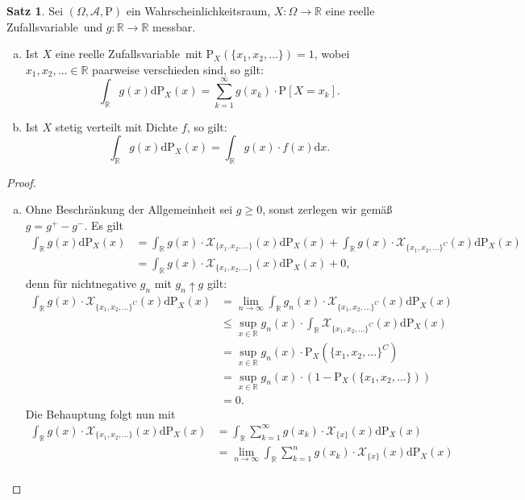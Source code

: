 \documentclass[a4paper,12pt,fleqn]{scrartcl}
\newcommand{\R}{\mathbb{R}}
\newcommand{\m}[1]{\mathcal{ #1 }}
\newcommand{\WR}{Wahrscheinlichkeitsraum}
\newcommand{\ZV}{Zufallsvariable}
\theoremstyle{definition}
\newtheorem{satz}[definition]{Satz}
\theoremstyle{plain}
\theoremstyle{remark}
\begin{document}
\begin{satz}
Sei $(\Omega, \m{A}, \text{P})$ ein \WR, $X: \Omega \rightarrow \R$ eine reelle \ZV \, und $g: \R \rightarrow \R$ messbar.
\begin{enumerate}[a)]
\item Ist $X$ eine reelle \ZV \, mit $\text{P}_X(\{x_1, x_2, \ldots\}) = 1$, wobei $x_1, x_2, \ldots \in \R$ paarweise verschieden sind, so gilt:
\[\int_\R g(x) \mathrm{d}\text{P}_X(x) = \sum_{k=1}^\infty g(x_k) \cdot \text{P}[X = x_k].\]
\item Ist $X$ stetig verteilt mit Dichte $f$, so gilt:
\[\int_\R g(x) \mathrm{d}\text{P}_X(x) = \int_\R g(x) \cdot f(x) \mathrm{d}x.\]
\end{enumerate}
\end{satz}
\begin{proof}
\begin{enumerate}[a)]
\item Ohne Beschränkung der Allgemeinheit sei $g \geq 0$, sonst zerlegen wir gemäß $g = g^+ - g^-$. Es gilt
\begin{align*}
\int_\R g(x) \mathrm{d}\text{P}_X(x) &= \int_\R g(x) \cdot \m{X}_{\{x_1, x_2, \ldots\}} (x) \mathrm{d}\text{P}_X(x) + \int_\R g(x) \cdot \m{X}_{\{x_1, x_2, \ldots\}^C} (x) \mathrm{d}\text{P}_X(x) \\
&= \int_\R g(x) \cdot \m{X}_{\{x_1, x_2, \ldots\}} (x) \mathrm{d}\text{P}_X(x) + 0,
\end{align*}
denn für nichtnegative $g_n$ mit $g_n \uparrow g$ gilt:
\begin{align*}
\int_\R g(x) \cdot \m{X}_{\{x_1, x_2, \ldots\}^C} (x) \mathrm{d}\text{P}_X(x) &= \lim_{n \rightarrow \infty} \int_\R g_n(x) \cdot \m{X}_{\{x_1, x_2, \ldots\}^C} (x) \mathrm{d}\text{P}_X(x) \\
&\leq \sup_{x \in \R} g_n(x) \cdot \int_\R \m{X}_{\{x_1, x_2, \ldots\}^C} (x) \mathrm{d}\text{P}_X(x) \\
&= \sup_{x \in \R} g_n(x) \cdot \text{P}_X(\{x_1, x_2, \ldots\}^C) \\
&= \sup_{x \in \R} g_n(x) \cdot (1 - \text{P}_X(\{x_1, x_2, \ldots\})) \\
&= 0.
\end{align*}
Die Behauptung folgt nun mit
\begin{align*}
\int_\R g(x) \cdot \m{X}_{\{x_1, x_2, \ldots\}} (x) \mathrm{d}\text{P}_X(x) &= \int_\R \sum_{k=1}^\infty g(x_k) \cdot \m{X}_{\{x\}} (x) \mathrm{d}\text{P}_X(x) \\
&= \lim_{n \rightarrow \infty} \int_\R \sum_{k=1}^n g(x_k) \cdot \m{X}_{\{x\}} (x) \mathrm{d}\text{P}_X(x) \\

\end{align*}
\end{enumerate}
\end{proof}
\end{document}
